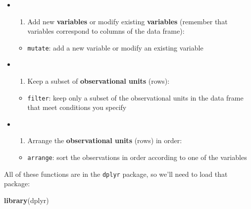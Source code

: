 \documentclass[]{article}
\newenvironment{Shaded}{\begin{snugshade}}{\end{snugshade}}
\newcommand{\KeywordTok}[1]{\textcolor[rgb]{0.13,0.29,0.53}{\textbf{#1}}}
\newcommand{\NormalTok}[1]{#1}
\providecommand{\tightlist}{%
  \setlength{\itemsep}{0pt}\setlength{\parskip}{0pt}}
\begin{document}
\begin{itemize}
\item
  \begin{enumerate}
  \def\labelenumi{\alph{enumi}.}
  \tightlist
  \item
    Add new \textbf{variables} or modify existing \textbf{variables}
    (remember that variables correspond to columns of the data frame):
  \end{enumerate}

  \begin{itemize}
  \tightlist
  \item
    \texttt{mutate}: add a new variable or modify an existing variable
  \end{itemize}
\item
  \begin{enumerate}
  \def\labelenumi{\alph{enumi}.}
  \setcounter{enumi}{1}
  \tightlist
  \item
    Keep a subset of \textbf{observational units} (rows):
  \end{enumerate}

  \begin{itemize}
  \tightlist
  \item
    \texttt{filter}: keep only a subset of the observational units in
    the data frame that meet conditions you specify
  \end{itemize}
\item
  \begin{enumerate}
  \def\labelenumi{\alph{enumi}.}
  \setcounter{enumi}{2}
  \tightlist
  \item
    Arrange the \textbf{observational units} (rows) in order:
  \end{enumerate}

  \begin{itemize}
  \tightlist
  \item
    \texttt{arrange}: sort the observations in order according to one of
    the variables
  \end{itemize}
\end{itemize}

All of these functions are in the \texttt{dplyr} package, so we'll need
to load that package:

\begin{Shaded}
\begin{Highlighting}[]
\KeywordTok{library}\NormalTok{(dplyr)}
\end{Highlighting}
\end{Shaded}
\end{document}
